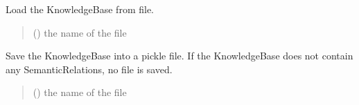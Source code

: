 \documentclass[letterpaper,10pt,english]{sphinxmanual}
\begin{document}
\begin{fulllineitems}
\begin{fulllineitems}
\begin{quote}
\begin{description}
\end{description}\end{quote}

\end{fulllineitems}


\begin{fulllineitems}
\label{\detokenize{medextractor.knowledge:medextractor.knowledge.base.KnowledgeBase.load}}
\pysigstartsignatures
{}
\pysigstopsignatures
\sphinxAtStartPar
Load the KnowledgeBase from file.
\begin{quote}\begin{description}
\sphinxAtStartPar
{} () \textendash{} the name of the file

\end{description}\end{quote}

\end{fulllineitems}


\begin{fulllineitems}
\label{\detokenize{medextractor.knowledge:medextractor.knowledge.base.KnowledgeBase.save}}
\pysigstartsignatures
{}
\pysigstopsignatures
\sphinxAtStartPar
Save the KnowledgeBase into a pickle file.
If the KnowledgeBase does not contain any SemanticRelations, no file is saved.
\begin{quote}\begin{description}
\sphinxAtStartPar
{} () \textendash{} the name of the file

\end{description}\end{quote}

\end{fulllineitems}


\end{fulllineitems}
\end{document}
